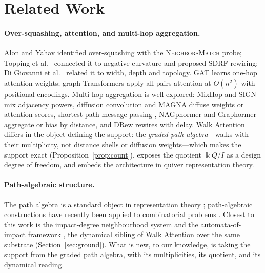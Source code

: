 \documentclass[runningheads]{llncs}
\newcommand{\kk}{\Bbbk}
\newcommand{\kQ}{\kk Q}
\begin{document}
\section{Related Work}\label{sec:related}

\paragraph{Over-squashing, attention, and multi-hop aggregation.}
Alon and Yahav \cite{alon2021bottleneck} identified over-squashing with the
\textsc{NeighborsMatch} probe; Topping et al.\ \cite{topping2022understanding}
connected it to negative curvature and proposed SDRF rewiring; Di Giovanni et
al.\ \cite{digiovanni2023oversquashing} related it to width, depth and
topology. GAT \cite{velickovic2017graph} learns one-hop attention weights;
graph Transformers apply all-pairs attention \cite{vaswani2017attention} at
$O(n^2)$ with positional encodings. Multi-hop aggregation is well explored:
MixHop \cite{abu2019mixhop} and SIGN \cite{frasca2020sign} mix adjacency
powers, diffusion convolution \cite{gasteiger2019diffusion} and MAGNA
\cite{wang2021magna} diffuse weights or attention scores, shortest-path
message passing \cite{abboud2022shortest}, NAGphormer
\cite{chen2023nagphormer} and Graphormer \cite{ying2021graphormer} aggregate
or bias by distance, and DRew \cite{gutteridge2023drew} rewires with delay.
Walk Attention differs in the object defining the support: the \emph{graded
path algebra}---walks with their multiplicity, not distance shells or
diffusion weights---which makes the support exact
(Proposition~\ref{prop:count}), exposes the quotient $\kQ/I$ as a design
degree of freedom, and embeds the architecture in quiver representation theory.

\paragraph{Path-algebraic structure.}
The path algebra is a standard object in representation theory
\cite{schiffler2014quiver,assem2006elements}; path-algebraic constructions
have recently been applied to combinatorial problems
\cite{moreno2021brauer,moreno2024integer}. Closest to this work is the
impact-degree neighbourhood system and the automata-of-impact framework
\cite{zainea2026aiq,ibanez2025casimulations}, the dynamical sibling of Walk
Attention over the same substrate (Section~\ref{sec:ground}). What is new, to
our knowledge, is taking the support from the graded path algebra, with its
multiplicities, its quotient, and its dynamical reading.
\end{document}
